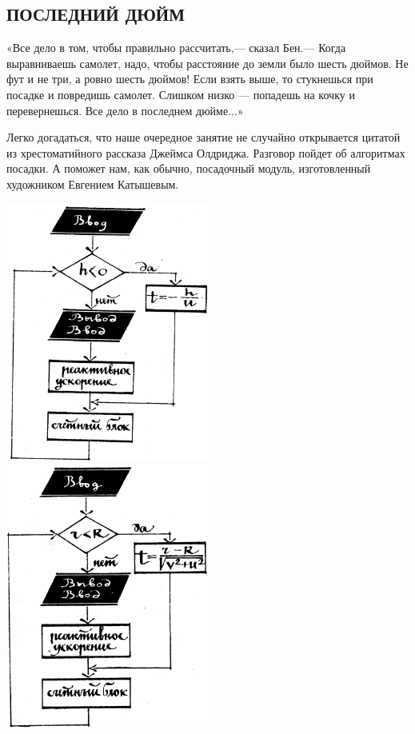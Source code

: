 \documentclass[11pt,a4paper,oneside]{article}
\begin{document}
\subsection{ПОСЛЕДНИЙ ДЮЙМ}
«Все дело в том, чтобы правильно рассчитать,— сказал Бен.— Когда выравниваешь самолет, надо, чтобы расстояние до земли было шесть дюймов. Не фут и не три, а ровно шесть дюймов! Если взять выше, то стукнешься при посадке и повредишь самолет. Слишком низко — попадешь на кочку и перевернешься. Все дело в последнем дюйме...»

Легко догадаться, что наше очередное занятие не случайно открывается цитатой из хрестоматийного рассказа Джеймса Олдриджа. Разговор пойдет об алгоритмах посадки. А поможет нам, как обычно, посадочный модуль, изготовленный художником Евгением Катышевым.

\includegraphics[width=0.5\textwidth]{last_d1}
\includegraphics[width=0.5\textwidth]{last_d4}
\end{document}
